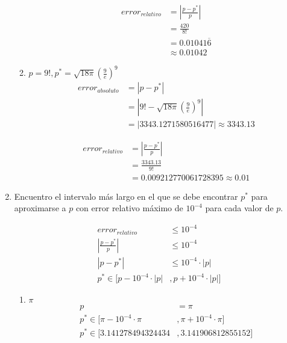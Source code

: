 \documentclass[12pt]{article}
\begin{document}
\begin{enumerate}
\begin{enumerate}[label=\alph*.]
            \[
            \begin{aligned}
                error_{relativo} &= \left| \frac{p - p^{*}}{p}\right| \\
                                 &= \frac{420}{8!} \\
                                 &= 0.01041\overline{6}\\
                                 &\approx 0.01042
            \end{aligned}
        \]
        \item \(p = 9!, p^{*} = \sqrt{18\pi}\left( \frac{9}{e}\right)^{9}\)
        \[
            \begin{aligned}
                error_{absoluto} &= \left| p - p^{*}\right| \\
                                 &= \left| 9! - \sqrt{18\pi}\left( \frac{9}{e}\right)^{9} \right| \\
                                 &= \left|3343.1271580516477\right| \approx 3343.13
            \end{aligned}
            \]
    
            \[
            \begin{aligned}
                error_{relativo} &= \left| \frac{p - p^{*}}{p}\right| \\
                                 &= \frac{3343.13}{9!} \\
                                 &= 0.009212770061728395\approx 0.01
            \end{aligned}
        \]
    \end{enumerate}
    \item Encuentro el intervalo más largo en el que se debe encontrar \(p^{*}\) para aproximarse a \(p\) con error relativo máximo de \(10^{-4}\) para cada valor de \(p\).

    \[
    \begin{aligned}
        error_{relativo} &\leq 10^{-4} \\
        \left|\frac{p-p^{*}}{p}\right| &\leq 10^{-4} \\
        \left|p-p^{*}\right| &\leq 10^{-4} \cdot |p| \\
        p^{*} \in [p-10^{-4}\cdot|p|& ,  p+10^{-4}\cdot|p|]
    \end{aligned}
    \]
    \begin{enumerate}[label=\alph*.]
        \item \(\pi\)
        \[
            \begin{aligned}
                p &= \pi \\   
                p^{*} \in [\pi-10^{-4}\cdot \pi& ,  \pi+10^{-4}\cdot\pi] \\
                p^{*} \in [3.141278494324434& ,  3.141906812855152]
            \end{aligned}
        \]


\end{enumerate}
\end{enumerate}
\end{document}
